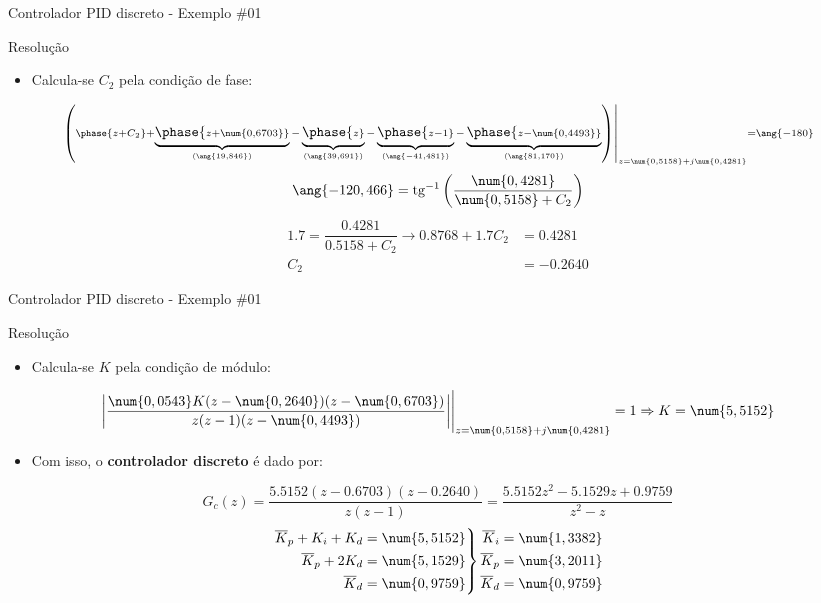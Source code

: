 \begin{frame}{Controlador PID discreto - Exemplo \#01}
\begin{block}{Resolução}
\begin{itemize}
    \item Calcula-se $ C_2 $ pela condição de fase:
\end{itemize}
	\[ \scriptstyle
	\left.\left( \phase{\scriptstyle z+C_2}+\underbrace{\strut \phase{\scriptstyle z+\num{0,6703}}}_{(\ang{19,846})}-\underbrace{\strut\phase{\scriptstyle z}}_{(\ang{39,691})}-\underbrace{\strut\phase{\scriptstyle z-1}}_{(\ang{-41,481})}-\underbrace{\strut\phase{\scriptstyle z-\num{0,4493}}}_{(\ang{81,170})} \right)  \right|_{z=\num{0,5158}+j\num{0,4281}}=\ang{-180} \]
	\[ 	\ang{-120,466}=\tg^{-1}\left( \dfrac{\num{0,4281}}{\num{0,5158}+C_2}\right) \]
	\begin{align*}
	\num{1,7}=\dfrac{\num{0,4281}}{\num{0,5158}+C_2}\rightarrow\num{0,8768}+\num{1,7}C_2&=\num{0,4281}\\
	C_2&=\num{-0,2640}
	\end{align*} 
\end{block}
\end{frame}


\begin{frame}{Controlador PID discreto - Exemplo \#01}
\begin{block}{Resolução}
\begin{itemize}
    \item Calcula-se $ K $ pela condição de módulo:
\end{itemize}
	\[ \eval{\left| \frac{\num{0,0543}K(z-\num{0,2640})(z-\num{0,6703})}{z(z-1)(z-\num{0,4493})} \right| }_{z=\num{0,5158}+j\num{0,4281}}=1\Rightarrow K=\num{5,5152} \]
\begin{itemize}
    \item Com isso, o \textbf{controlador discreto} é dado por:
\end{itemize}
$$G_c(z)=\dfrac{\num{5,5152}(z-\num{0,6703})(z-\num{0,2640})}{z(z-1)}=\dfrac{\num{5,5152}z^{2}-\num{5,1529}z+\num{0,9759}}{z^{2}-z}$$
	\[ \left. \begin{aligned}
		\conj{K}_p + {K}_i + {K}_d &=\num{5,5152}\\
		\conj{K}_p +2{K}_d &=\num{5,1529}\\
		\conj{K}_d &=\num{0,9759}
		\end{aligned} \right\rbrace \begin{aligned}
		\conj{K}_i &=\num{1,3382}\\
		\conj{K}_p &=\num{3,2011}\\
		\conj{K}_d &=\num{0,9759}
		\end{aligned} \]
\end{block}
\end{frame}

